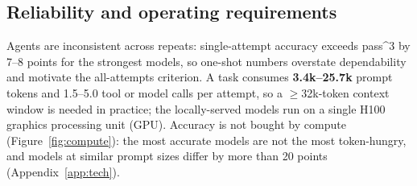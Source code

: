 \subsection{Reliability and operating requirements}
\label{sec:results:reliability}
Agents are inconsistent across repeats: single-attempt accuracy exceeds
pass\textasciicircum{}3 by 7--8 points for the strongest models, so one-shot
numbers overstate dependability and motivate the all-attempts criterion. A
task consumes \textbf{3.4k--25.7k} prompt tokens and 1.5--5.0 tool or model
calls per attempt, so a \(\geq\)32k-token context window is needed in
practice; the locally-served models run on a single H100 graphics processing
unit (GPU). Accuracy is not bought by compute
(Figure~\ref{fig:compute}): the most accurate models are not the most
token-hungry, and models at similar prompt sizes differ by more than 20
points (Appendix~\ref{app:tech}).

